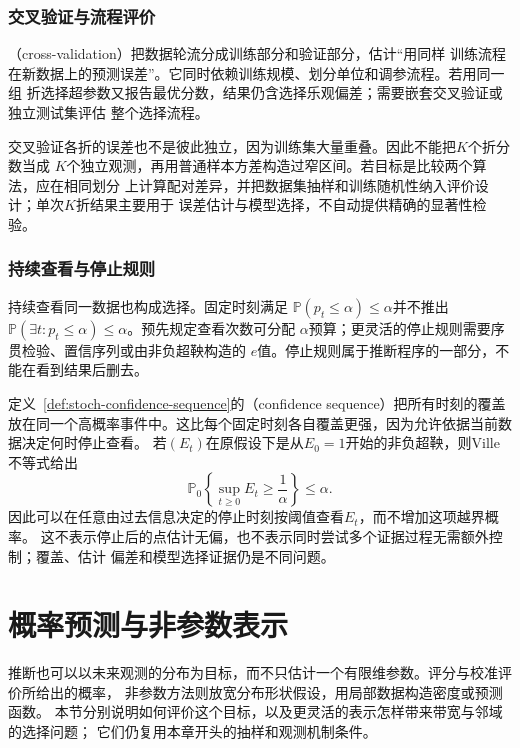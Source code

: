 \subsubsection{交叉验证与流程评价}

（cross-validation）把数据轮流分成训练部分和验证部分，估计“用同样
训练流程在新数据上的预测误差”。它同时依赖训练规模、划分单位和调参流程。若用同一组
折选择超参数又报告最优分数，结果仍含选择乐观偏差；需要嵌套交叉验证或独立测试集评估
整个选择流程。

交叉验证各折的误差也不是彼此独立，因为训练集大量重叠。因此不能把\(K\)个折分数当成
\(K\)个独立观测，再用普通样本方差构造过窄区间。若目标是比较两个算法，应在相同划分
上计算配对差异，并把数据集抽样和训练随机性纳入评价设计；单次\(K\)折结果主要用于
误差估计与模型选择，不自动提供精确的显著性检验。

\subsubsection{持续查看与停止规则}

持续查看同一数据也构成选择。固定时刻满足
\(\mathbb{P}(p_t\leq\alpha)\leq\alpha\)并不推出
\(\mathbb{P}(\exists t:p_t\leq\alpha)\leq\alpha\)。预先规定查看次数可分配
\(\alpha\)预算；更灵活的停止规则需要序贯检验、置信序列或由非负超鞅构造的
\(e\)值。停止规则属于推断程序的一部分，不能在看到结果后删去。

定义~\ref{def:stoch-confidence-sequence}的（confidence sequence）把所有时刻的覆盖放在同一个高概率事件中。这比每个固定时刻各自覆盖更强，因为允许依据当前数据决定何时停止查看。
若\((E_t)\)在原假设下是从\(E_0=1\)开始的非负超鞅，则Ville不等式给出
\[
  \mathbb{P}_0\left\{\sup_{t\geq0}E_t\geq\frac1\alpha\right\}\leq\alpha.
\]
因此可以在任意由过去信息决定的停止时刻按阈值查看\(E_t\)，而不增加这项越界概率。
这不表示停止后的点估计无偏，也不表示同时尝试多个证据过程无需额外控制；覆盖、估计
偏差和模型选择证据仍是不同问题。

\section{概率预测与非参数表示}
\label{sec:stats-prediction-observation-limits}

推断也可以以未来观测的分布为目标，而不只估计一个有限维参数。评分与校准评价所给出的概率，
非参数方法则放宽分布形状假设，用局部数据构造密度或预测函数。
本节分别说明如何评价这个目标，以及更灵活的表示怎样带来带宽与邻域的选择问题；
它们仍复用本章开头的抽样和观测机制条件。

